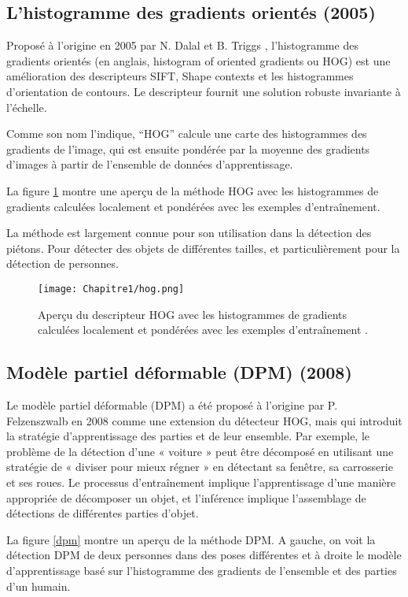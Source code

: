 \subsection{L'histogramme des gradients orientés  (2005)}

Proposé à l'origine en 2005 par N. Dalal et B. Triggs \cite{hog}, l'histogramme des gradients orientés (en anglais, histogram of oriented gradients ou HOG) est une amélioration des descripteurs SIFT, Shape contexts et les histogrammes d'orientation de contours. Le descripteur fournit une solution robuste invariante à l'échelle. 

Comme son nom l'indique, “HOG” calcule une carte des histogrammes des gradients de l'image, qui est ensuite pondérée par la moyenne des gradients d'images à partir de l'ensemble de données d'apprentissage.

La figure \ref{hog} montre une aperçu de la méthode HOG avec les histogrammes de gradients calculées localement et pondérées avec les exemples d'entraînement.

La méthode est largement connue pour son utilisation dans la détection des piétons. Pour détecter des objets de différentes tailles, et particulièrement pour la détection de personnes.

\begin{figure}[H]
\centering
\texttt{[image: Chapitre1/hog.png]}
\caption{Aperçu du descripteur HOG avec les histogrammes de gradients calculées localement et pondérées avec les exemples d'entraînement \cite{w1}.}
\label{hog}
\end{figure}


\subsection{Modèle partiel déformable (DPM) (2008)} 

Le modèle partiel déformable (DPM) \cite{dpm} a été proposé à l'origine par P. Felzenszwalb en 2008 comme une extension du détecteur HOG, mais qui introduit la stratégie d'apprentissage des parties et de leur ensemble. 
Par exemple, le problème de la détection d'une « voiture » peut être décomposé en utilisant une stratégie de « diviser pour mieux régner » en détectant sa fenêtre, sa carrosserie et ses roues. Le processus d'entraînement implique l'apprentissage d'une manière appropriée de décomposer un objet, et l'inférence implique l'assemblage de détections de différentes parties d'objet.

La figure \ref{dpm}  montre un aperçu de la méthode DPM. A gauche, on voit la détection  DPM de deux personnes dans des poses différentes et à droite le modèle d'apprentissage basé sur l’histogramme des gradients de l'ensemble et des parties d'un humain.

